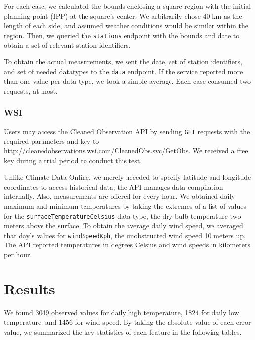\documentclass[12pt]{article}
\begin{document}
        For each case, we calculated the bounds enclosing a square region with
        the initial planning point (IPP) at the square's center. We arbitrarily
        chose 40 km as the length of each side, and assumed weather conditions
        would be similar within the region. Then, we queried the
        \texttt{stations} endpoint with the bounds and date to obtain a set of
        relevant station identifiers.

        To obtain the actual measurements, we sent the date, set of station
        identifiers, and set of needed datatypes to the \texttt{data} endpoint.
        If the service reported more than one value per data type, we took a
        simple average. Each case consumed two requests, at most.

      \subsubsection{WSI}
        Users may access the Cleaned Observation API \cite{wsi} by sending
        \texttt{GET} requests with the required parameters and key to
        \url{http://cleanedobservations.wsi.com/CleanedObs.svc/GetObs}. We
        received a free key during a trial period to conduct this test.

        Unlike Climate Data Online, we merely neeeded to specify latitude and
        longitude coordinates to access historical data; the API manages data
        compilation internally. Also, measurements are offered for every hour.
        We obtained daily maximum and minimum temperatures by taking the
        extremes of a list of values for the \texttt{surfaceTemperatureCelsius}
        data type, the dry bulb temperature two meters above the surface. To
        obtain the average daily wind speed, we averaged that day's values for
        \texttt{windSpeedKph}, the unobstructed wind speed 10 meters up. The
        API reported temperatures in degrees Celsius and wind speeds in
        kilometers per hour.

  \section{Results}
    We found 3049 observed values for daily high temperature, 1824 for daily
    low temperature, and 1456 for wind speed. By taking the absolute value of
    each error value, we summarized the key statistics of each feature in the
    following tables.

    \renewcommand{\arraystretch}{1.25}
\end{document}
